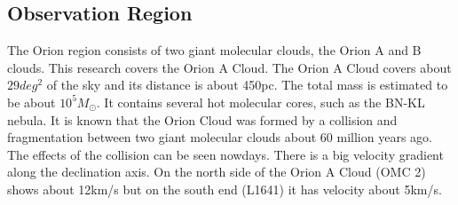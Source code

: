 \documentclass[twoside,11pt]{gshs_thesis}
\begin{document}
\subsection{Observation Region}
The Orion region consists of two giant molecular clouds, the Orion A and B clouds. This research covers the Orion A Cloud. The Orion A Cloud covers about $29 deg^2$ of the sky and its distance is about 450pc. \cite{Oriondistance}The total mass is estimated to be about $10^5 M_{\odot}$. It contains several hot molecular cores, such as the BN-KL nebula. It is known that the Orion Cloud was formed by a collision and fragmentation between two giant molecular clouds about 60 million years ago. The effects of the collision can be seen nowdays. There is a big velocity gradient along the declination axis. On the north side of the Orion A Cloud (OMC 2) shows about 12km/s but on the south end (L1641) it has velocity about 5km/s. \cite{Schulz}
\end{document}
